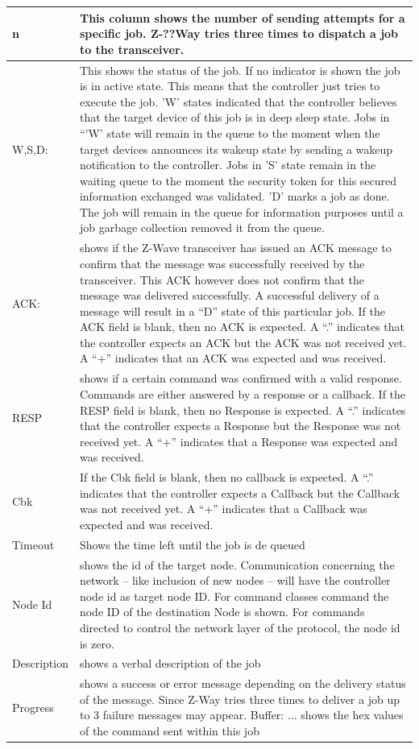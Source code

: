 \begin{table} 
\begin{tabular}{|p{}|p{}|} 
\hline
n	&This column shows the number of sending attempts for a specific job. Z-??Way tries three times to dispatch a job to the transceiver.\\ 
\hline 
W,S,D: & This shows the status of the job. If no indicator is shown the job is in active state. This means that the controller just tries to execute the job. 'W' states indicated that the controller believes that the target device of this job is in deep sleep state. Jobs in “'W' state will remain in the queue to the moment when the target devices announces its wakeup state by sending a wakeup notification to the controller. Jobs in 'S' state remain in the waiting queue to the moment the security token for this secured information exchanged was validated.
'D' marks a job as done. The job will remain in the queue for information purposes until a job garbage collection removed it from the queue.\\ 
\hline 
ACK:& shows if the Z-Wave transceiver has issued an ACK message to confirm that the message was successfully received by the transceiver. This ACK however does not confirm that the message was delivered successfully. A successful delivery of a message will result in a “D” state of this particular job.
If the ACK field is blank, then no ACK is expected. A “.” indicates that the controller expects an ACK but the ACK was not received yet. A “+” indicates that an ACK was expected and was received.\\ 
\hline
RESP	&shows if a certain command was confirmed with a valid response. Commands are either answered by a response or a callback.
If the RESP field is blank, then no Response is expected. A “.” indicates that the controller expects a Response but the Response was not received yet. A “+” indicates that a Response was expected and was received.\\ 
\hline
Cbk	&If the Cbk field is blank, then no callback is expected. A “.” indicates that the controller
expects a Callback but the Callback was not received yet. A “+” indicates that a Callback was expected and was received.\\
\hline 
Timeout	&Shows the time left until the job is de queued \\ 
\hline
Node Id	&shows the id of the target node. Communication concerning the network – like inclusion of new nodes – will have the controller node id as target node ID. For command classes command the node ID of the destination Node is shown. For commands directed to control the network layer of the protocol, the node id is zero. \\
\hline
Description	&shows a verbal description of the job \\
\hline
Progress	&shows a success or error message depending on the delivery status of the message. Since Z-Way tries three times to deliver a job up to 3 failure messages may appear.
Buffer: ... shows the hex values of the command sent within this job \\


\end{tabular}
\end{table}
